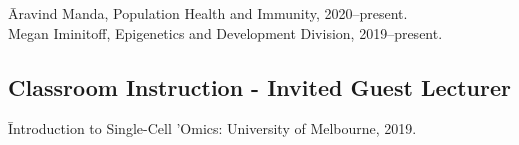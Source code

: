 \documentclass[11pt,letterpaper,pdf]{article}
\begin{document}
\begin{tabbing}
  \=Aravind Manda, Population Health and Immunity, 2020--present.\\
  \>Megan Iminitoff, Epigenetics and Development Division, 2019--present.\\
\end{tabbing}

\subsection*{Classroom Instruction - Invited Guest Lecturer}

\begin{tabbing}
  \=Introduction to Single-Cell 'Omics: University of Melbourne, 2019.
\end{tabbing}

%


%
\end{document}
